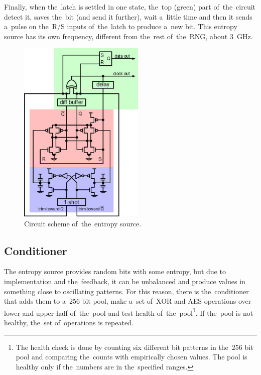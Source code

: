 Finally, when the~latch is settled in one state, the~top (green) part 
of~the~circuit detect it, saves the~bit (and send it further), wait 
a~little time and then it sends a~pulse on the~R/S inputs of~the~latch 
to produce a~new bit. This entropy source has its own frequency, different 
from the~rest of~the~RNG, about 3~GHz.

\begin{figure}[h!]
  \centering
 \includegraphics[width=6cm,keepaspectratio]{fig/entropy-source-circuit} %
\caption{Circuit scheme of~the~entropy source\cite{UnderstandingRdRandElectronic}.}
\label{fig:ES-circuit}
\end{figure}

\subsection{Conditioner}
The entropy source provides random bits with some entropy, but due to implementation and the~feedback, it can be unbalanced and produce values in something close to oscillating patterns. For this reason, there is the~conditioner that adds them to a~256 bit pool, make a~set of~XOR and AES operations over lower and upper half of~the~pool and test health of~the~pool\footnote{The health check is done by counting six different bit patterns in the~256 bit pool and comparing the~counts with empirically chosen values. The pool is healthy only if the~numbers are in the~specified ranges.}\cite{AnalysisOfDRNG,UnderstandingRdRandElectronic}. If the~pool is not healthy, the~set of~operations is repeated. 

